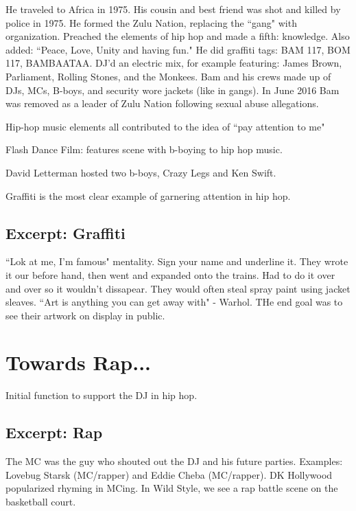\documentclass[12pt, a4paper, twoside, openright, titlepage]{book}
\begin{document}
He traveled to Africa in 1975. His cousin and best friend was shot and killed by police in 1975. He formed the Zulu Nation, replacing the ``gang" with organization. Preached the elements of hip hop and made a fifth: knowledge. Also added: ``Peace, Love, Unity and having fun." He did graffiti tags: BAM 117, BOM 117, BAMBAATAA. DJ'd an electric mix, for example featuring: James Brown, Parliament, Rolling Stones, and the Monkees. Bam and his crews made up of DJs, MCs, B-boys, and security wore jackets (like in gangs). In June 2016 Bam was removed as a leader of Zulu Nation following sexual abuse allegations.

\begin{rmk}{}{}
    Hip-hop music elements all contributed to the idea of ``pay attention to me"
\end{rmk}

Flash Dance Film: features scene with b-boying to hip hop music.

David Letterman hosted two b-boys, Crazy Legs and Ken Swift.

\begin{note}{}{}
    Graffiti is the most clear example of garnering attention in hip hop.
\end{note}

\subsection{Excerpt: Graffiti}

``Lok at me, I'm famous" mentality. Sign your name and underline it. They wrote it our before hand, then went and expanded onto the trains. Had to do it over and over so it wouldn't dissapear. They would often steal spray paint using jacket sleaves. ``Art is anything you can get away with" - Warhol. THe end goal was to see their artwork on display in public.


\section{Towards Rap...}

Initial function to support the DJ in hip hop.

\subsection{Excerpt: Rap}

The MC was the guy who shouted out the DJ and his future parties. Examples: Lovebug Starsk (MC/rapper) and Eddie Cheba (MC/rapper). DK Hollywood  popularized rhyming in MCing. In Wild Style, we see a rap battle scene on the basketball court. 
\end{document}
